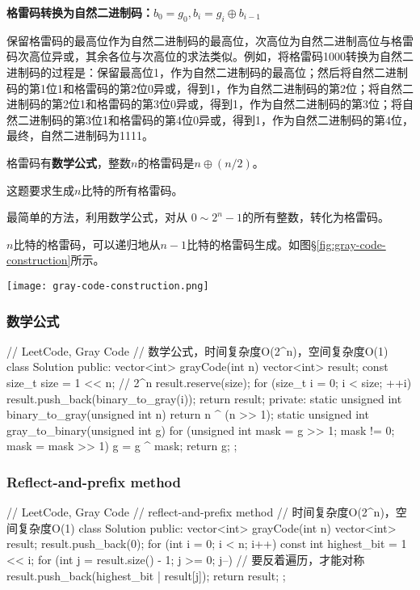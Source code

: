 \textbf{格雷码转换为自然二进制码：$b_0=g_0, b_i=g_i \oplus b_{i-1}$}

保留格雷码的最高位作为自然二进制码的最高位，次高位为自然二进制高位与格雷码次高位异或，其余各位与次高位的求法类似。例如，将格雷码1000转换为自然二进制码的过程是：保留最高位1，作为自然二进制码的最高位；然后将自然二进制码的第1位1和格雷码的第2位0异或，得到1，作为自然二进制码的第2位；将自然二进制码的第2位1和格雷码的第3位0异或，得到1，作为自然二进制码的第3位；将自然二进制码的第3位1和格雷码的第4位0异或，得到1，作为自然二进制码的第4位，最终，自然二进制码为1111。

格雷码有\textbf{数学公式}，整数$n$的格雷码是$n \oplus (n/2)$。

这题要求生成$n$比特的所有格雷码。

最简单的方法，利用数学公式，对从 $0\sim2^n-1$的所有整数，转化为格雷码。

$n$比特的格雷码，可以递归地从$n-1$比特的格雷码生成。如图\S \ref{fig:gray-code-construction}所示。

\begin{center}
\texttt{[image: gray-code-construction.png]}\\
\label{fig:gray-code-construction}
\end{center}


\subsubsection{数学公式}
\begin{Code}
// LeetCode, Gray Code
// 数学公式，时间复杂度O(2^n)，空间复杂度O(1)
class Solution {
public:
    vector<int> grayCode(int n) {
        vector<int> result;
        const size_t size = 1 << n;  // 2^n
        result.reserve(size);
        for (size_t i = 0; i < size; ++i)
            result.push_back(binary_to_gray(i));
        return result;
    }
private:
    static unsigned int binary_to_gray(unsigned int n) {
        return n ^ (n >> 1);
    }
    static unsigned int gray_to_binary(unsigned int g) {
        for (unsigned int mask = g >> 1; mask != 0; mask = mask >> 1)
            g = g ^ mask;
        return g;
    }
};
\end{Code}


\subsubsection{Reflect-and-prefix method}
\begin{Code}
// LeetCode, Gray Code
// reflect-and-prefix method
// 时间复杂度O(2^n)，空间复杂度O(1)
class Solution {
public:
    vector<int> grayCode(int n) {
        vector<int> result;
        result.push_back(0);
        for (int i = 0; i < n; i++) {
            const int highest_bit = 1 << i;
            for (int j = result.size() - 1; j >= 0; j--) // 要反着遍历，才能对称
                result.push_back(highest_bit | result[j]);
        }
        return result;
    }
};
\end{Code}


